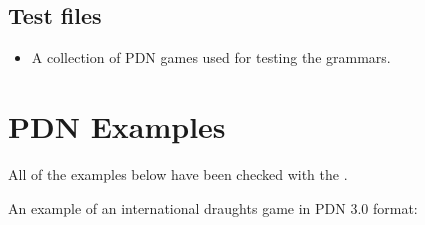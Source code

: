 \documentclass[letterpaper,10pt,english]{sphinxmanual}
\begin{document}
\section{Test files}
\label{\detokenize{implementation:test-files}}\begin{itemize}
\item {} 
\sphinxAtStartPar
{} A collection of PDN games used for testing the grammars.

\end{itemize}

\sphinxstepscope


\chapter{PDN Examples}
\label{\detokenize{examples:pdn-examples}}\label{\detokenize{examples::doc}}
\sphinxAtStartPar
All of the examples below have been checked with the .

\sphinxAtStartPar
An example of an international draughts game in PDN 3.0 format:
\end{document}
